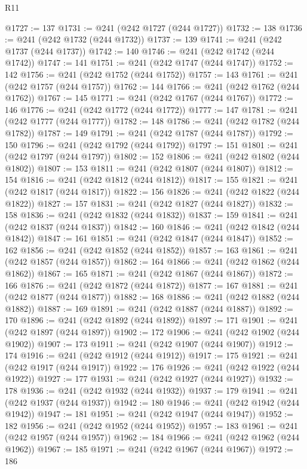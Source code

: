 \begin{lexlean}{R11}
\begin{coremodule}
{{{{{{{{{{{{{{{{{{{{{{{{{{{{{{{{{{{{{{{{{{{{{{{{{{{{{{{{{{{{{{{{{{{{{{{{{{{{{{{{{{{{{{{{{{{{{{{{{{{{{{{{{{@1727 := 137
@1731 := @241 (@242 @1727 (@244 @1727))
@1732 := 138
@1736 := @241 (@242 @1732 (@244 @1732))
@1737 := 139
@1741 := @241 (@242 @1737 (@244 @1737))
@1742 := 140
@1746 := @241 (@242 @1742 (@244 @1742))
@1747 := 141
@1751 := @241 (@242 @1747 (@244 @1747))
@1752 := 142
@1756 := @241 (@242 @1752 (@244 @1752))
@1757 := 143
@1761 := @241 (@242 @1757 (@244 @1757))
@1762 := 144
@1766 := @241 (@242 @1762 (@244 @1762))
@1767 := 145
@1771 := @241 (@242 @1767 (@244 @1767))
@1772 := 146
@1776 := @241 (@242 @1772 (@244 @1772))
@1777 := 147
@1781 := @241 (@242 @1777 (@244 @1777))
@1782 := 148
@1786 := @241 (@242 @1782 (@244 @1782))
@1787 := 149
@1791 := @241 (@242 @1787 (@244 @1787))
@1792 := 150
@1796 := @241 (@242 @1792 (@244 @1792))
@1797 := 151
@1801 := @241 (@242 @1797 (@244 @1797))
@1802 := 152
@1806 := @241 (@242 @1802 (@244 @1802))
@1807 := 153
@1811 := @241 (@242 @1807 (@244 @1807))
@1812 := 154
@1816 := @241 (@242 @1812 (@244 @1812))
@1817 := 155
@1821 := @241 (@242 @1817 (@244 @1817))
@1822 := 156
@1826 := @241 (@242 @1822 (@244 @1822))
@1827 := 157
@1831 := @241 (@242 @1827 (@244 @1827))
@1832 := 158
@1836 := @241 (@242 @1832 (@244 @1832))
@1837 := 159
@1841 := @241 (@242 @1837 (@244 @1837))
@1842 := 160
@1846 := @241 (@242 @1842 (@244 @1842))
@1847 := 161
@1851 := @241 (@242 @1847 (@244 @1847))
@1852 := 162
@1856 := @241 (@242 @1852 (@244 @1852))
@1857 := 163
@1861 := @241 (@242 @1857 (@244 @1857))
@1862 := 164
@1866 := @241 (@242 @1862 (@244 @1862))
@1867 := 165
@1871 := @241 (@242 @1867 (@244 @1867))
@1872 := 166
@1876 := @241 (@242 @1872 (@244 @1872))
@1877 := 167
@1881 := @241 (@242 @1877 (@244 @1877))
@1882 := 168
@1886 := @241 (@242 @1882 (@244 @1882))
@1887 := 169
@1891 := @241 (@242 @1887 (@244 @1887))
@1892 := 170
@1896 := @241 (@242 @1892 (@244 @1892))
@1897 := 171
@1901 := @241 (@242 @1897 (@244 @1897))
@1902 := 172
@1906 := @241 (@242 @1902 (@244 @1902))
@1907 := 173
@1911 := @241 (@242 @1907 (@244 @1907))
@1912 := 174
@1916 := @241 (@242 @1912 (@244 @1912))
@1917 := 175
@1921 := @241 (@242 @1917 (@244 @1917))
@1922 := 176
@1926 := @241 (@242 @1922 (@244 @1922))
@1927 := 177
@1931 := @241 (@242 @1927 (@244 @1927))
@1932 := 178
@1936 := @241 (@242 @1932 (@244 @1932))
@1937 := 179
@1941 := @241 (@242 @1937 (@244 @1937))
@1942 := 180
@1946 := @241 (@242 @1942 (@244 @1942))
@1947 := 181
@1951 := @241 (@242 @1947 (@244 @1947))
@1952 := 182
@1956 := @241 (@242 @1952 (@244 @1952))
@1957 := 183
@1961 := @241 (@242 @1957 (@244 @1957))
@1962 := 184
@1966 := @241 (@242 @1962 (@244 @1962))
@1967 := 185
@1971 := @241 (@242 @1967 (@244 @1967))
@1972 := 186
}}}}}}}}}}}}}}}}}}}}}}}}}}}}}}}}}}}}}}}}}}}}}}}}}}}}}}}}}}}}}}}}}}}}}}}}}}}}}}}}}}}}}}}}}}}}}}}}}}}}}}}}}}
\end{coremodule}
\end{lexlean}
